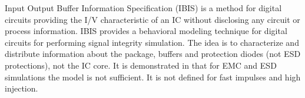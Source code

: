 Input Output Buffer Information Specification (IBIS) \cite{ibis-spec} is a method for digital circuits providing the I/V characteristic of an IC without disclosing any circuit or process information.
IBIS provides a behavioral modeling technique for digital circuits for performing signal integrity simulation.
The idea is to characterize and distribute information about the package, buffers and protection diodes (not ESD protections), not the IC core.
It is demonstrated in \cite{ibisImprovementFabrice} that for EMC and ESD simulations the model is not sufficient.
It is not defined for fast impulses and high injection.
